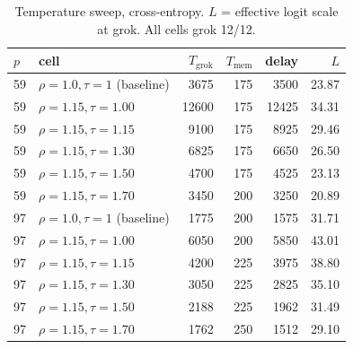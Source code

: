 \begin{table}[h]\centering\small
\caption{Temperature sweep, cross-entropy. $L$ = effective logit scale at grok. All cells grok 12/12.}
\label{tab:medce}
\begin{tabular}{llrrrr}
\toprule
$p$ & cell & $T_{\mathrm{grok}}$ & $T_{\mathrm{mem}}$ & delay & $L$ \\
\midrule
59 & $\rho{=}1.0,\tau{=}1$ (baseline) & 3675 & 175 & 3500 & 23.87 \\
59 & $\rho{=}1.15,\tau{=}1.00$ & 12600 & 175 & 12425 & 34.31 \\
59 & $\rho{=}1.15,\tau{=}1.15$ & 9100 & 175 & 8925 & 29.46 \\
59 & $\rho{=}1.15,\tau{=}1.30$ & 6825 & 175 & 6650 & 26.50 \\
59 & $\rho{=}1.15,\tau{=}1.50$ & 4700 & 175 & 4525 & 23.13 \\
59 & $\rho{=}1.15,\tau{=}1.70$ & 3450 & 200 & 3250 & 20.89 \\
\midrule
97 & $\rho{=}1.0,\tau{=}1$ (baseline) & 1775 & 200 & 1575 & 31.71 \\
97 & $\rho{=}1.15,\tau{=}1.00$ & 6050 & 200 & 5850 & 43.01 \\
97 & $\rho{=}1.15,\tau{=}1.15$ & 4200 & 225 & 3975 & 38.80 \\
97 & $\rho{=}1.15,\tau{=}1.30$ & 3050 & 225 & 2825 & 35.10 \\
97 & $\rho{=}1.15,\tau{=}1.50$ & 2188 & 225 & 1962 & 31.49 \\
97 & $\rho{=}1.15,\tau{=}1.70$ & 1762 & 250 & 1512 & 29.10 \\
\bottomrule
\end{tabular}
\end{table}

